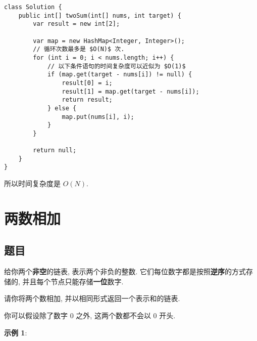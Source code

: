 \documentclass[oneside]{ctexbook}
\begin{document}
\begin{verbatim}
class Solution {
    public int[] twoSum(int[] nums, int target) {
        var result = new int[2];

        var map = new HashMap<Integer, Integer>();
        // 循环次数最多是 $O(N)$ 次.
        for (int i = 0; i < nums.length; i++) {
            // 以下条件语句的时间复杂度可以近似为 $O(1)$
            if (map.get(target - nums[i]) != null) {
                result[0] = i;
                result[1] = map.get(target - nums[i]);
                return result;
            } else {
                map.put(nums[i], i);
            }
        }

        return null;
    }
}
\end{verbatim}

所以时间复杂度是 $O(N)$.

\chapter{两数相加}

\section{题目}

给你两个\textbf{非空}的链表, 表示两个非负的整数. 它们每位数字都是按照\textbf{逆序}的方式存储的, 并且每个节点只能存储\textbf{一位}数字.

请你将两个数相加, 并以相同形式返回一个表示和的链表.

你可以假设除了数字 0 之外, 这两个数都不会以 0 开头.

\textbf{示例 1}:



\end{document}

